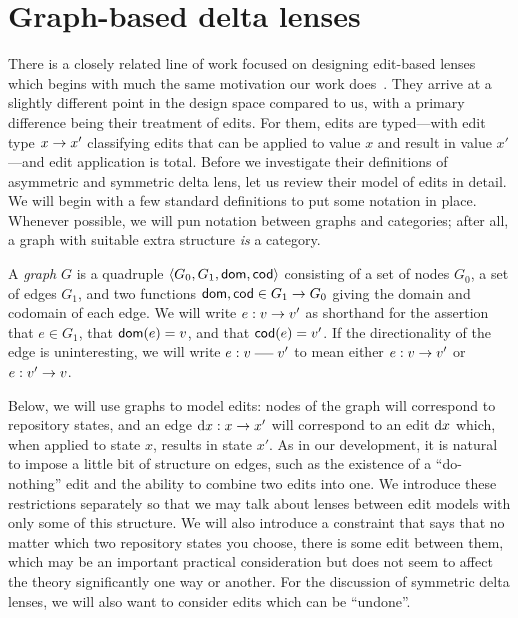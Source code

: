 \section{Graph-based delta lenses}
\label{sec:delta}
There is a closely related line of work focused on designing edit-based
lenses which begins with much the same motivation our work
does~\cite{diskin2011asymmetric,Diskin-Delta11,hermann2011correctness,Pacheco2012}.
They arrive at a slightly different point in the design space compared to
us, with a primary difference being their treatment of edits. For them,
edits are typed---with edit type $x \to x'$ classifying edits that can be
applied to value $x$ and result in value $x'$---and edit application is
total. Before we investigate their definitions of asymmetric and symmetric
delta lens, let us review their model of edits in detail. We will begin with
a few standard definitions to put some notation in place. Whenever possible,
we will pun notation between graphs and categories; after all, a graph with
suitable extra structure \emph{is} a category.

\begin{definition}
    A \emph{graph} $G$ is a quadruple $\left<G_0,G_1,\mathsf{dom},\mathsf{cod}\right>$
    consisting of a set of nodes $G_0$, a set of edges $G_1$, and two
    functions $\mathsf{dom},\mathsf{cod} \in G_1 \to G_0$ giving the domain and codomain
    of each edge. We will write $e:v \to v'$ as shorthand for the
    assertion that $e \in G_1$, that $\mathsf{dom}(e)=v$, and that $\mathsf{cod}(e)=v'$.
    If the directionality of the edge is uninteresting, we will write $e:v
    \uedge v'$ to mean either $e: v \to v'$ or $e: v' \to v$.
\end{definition}

Below, we will use graphs to model edits: nodes of the graph will correspond
to repository states, and an edge $\textrm{d} x : x \to x'$ will correspond to an
edit $\textrm{d} x$ which, when applied to state $x$, results in state $x'$. As in
our development, it is natural to impose a little bit of structure on edges,
such as the existence of a ``do-nothing'' edit and the ability to combine
two edits into one. We introduce these restrictions separately so that we
may talk about lenses between edit models with only some of this structure.
We will also introduce a constraint that says that no matter which two
repository states you choose, there is some edit between them, which may be
an important practical consideration but does not seem to affect the theory
significantly one way or another. For the discussion of symmetric delta
lenses, we will also want to consider edits which can be ``undone''.

